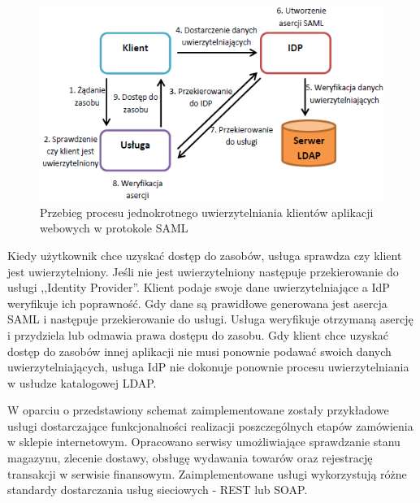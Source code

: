 	\begin{figure}[!htb]
		\centering
		\includegraphics{img/samlWebSSO.png}
		\caption{Przebieg procesu jednokrotnego uwierzytelniania klientów aplikacji webowych w protokole SAML}
		\label{samlSSOSteps}
	\end{figure}
		
	Kiedy użytkownik chce uzyskać dostęp do zasobów, usługa sprawdza czy klient jest uwierzytelniony. Jeśli nie jest uwierzytelniony następuje przekierowanie do usługi ,,Identity Provider''. Klient podaje swoje dane uwierzytelniające a IdP weryfikuje ich poprawność. Gdy dane są prawidłowe generowana jest asercja SAML i następuje przekierowanie do usługi. Usługa weryfikuje otrzymaną asercję i przydziela lub odmawia prawa dostępu do zasobu. Gdy klient chce uzyskać dostęp do zasobów innej aplikacji nie musi ponownie podawać swoich danych uwierzytelniających, usługa IdP nie dokonuje ponownie procesu uwierzytelniania w usłudze katalogowej LDAP.
	
	W oparciu o przedstawiony schemat zaimplementowane zostały przykładowe usługi dostarczające funkcjonalności realizacji poszczególnych etapów  zamówienia w sklepie internetowym. Opracowano serwisy umożliwiające sprawdzanie stanu magazynu, zlecenie dostawy, obsługę wydawania towarów oraz rejestrację transakcji w serwisie finansowym. Zaimplementowane usługi wykorzystują różne standardy dostarczania usług sieciowych - REST lub SOAP. 




